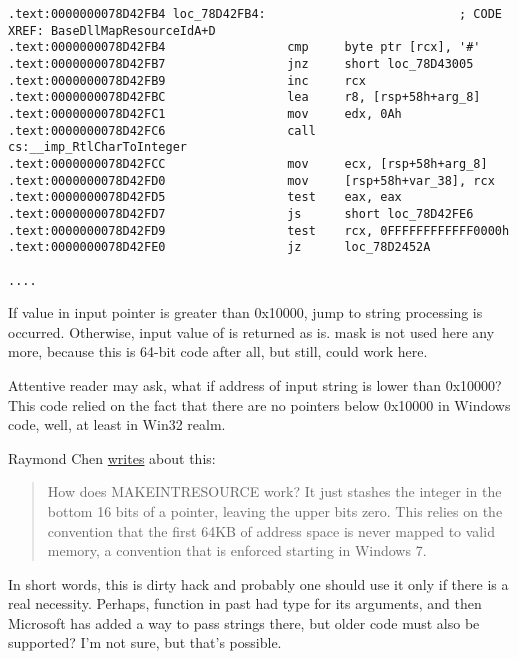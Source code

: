 \begin{lstlisting}[style=customasm]
.text:0000000078D42FB4 loc_78D42FB4:                           ; CODE XREF: BaseDllMapResourceIdA+D
.text:0000000078D42FB4                 cmp     byte ptr [rcx], '#'
.text:0000000078D42FB7                 jnz     short loc_78D43005
.text:0000000078D42FB9                 inc     rcx
.text:0000000078D42FBC                 lea     r8, [rsp+58h+arg_8]
.text:0000000078D42FC1                 mov     edx, 0Ah
.text:0000000078D42FC6                 call    cs:__imp_RtlCharToInteger
.text:0000000078D42FCC                 mov     ecx, [rsp+58h+arg_8]
.text:0000000078D42FD0                 mov     [rsp+58h+var_38], rcx
.text:0000000078D42FD5                 test    eax, eax
.text:0000000078D42FD7                 js      short loc_78D42FE6
.text:0000000078D42FD9                 test    rcx, 0FFFFFFFFFFFF0000h
.text:0000000078D42FE0                 jz      loc_78D2452A

....

\end{lstlisting}

If value in input pointer is greater than 0x10000, jump to string processing is occurred.
Otherwise, input value of  is returned as is.
 mask is not used here any more, because this is 64-bit code after all, but still,  could work here.

Attentive reader may ask, what if address of input string is lower than 0x10000?
This code relied on the fact that there are no pointers below 0x10000 in Windows code, well, at least in Win32 realm.

Raymond Chen \href{https://blogs.msdn.microsoft.com/oldnewthing/20130925-00/?p=3123}{writes} about this:

\begin{framed}
\begin{quotation}
How does MAKE­INT­RESOURCE work? It just stashes the integer in the bottom 16 bits of a pointer, leaving the upper bits zero. This relies on the convention that the first 64KB of address space is never mapped to valid memory, a convention that is enforced starting in Windows 7.
\end{quotation}
\end{framed}

In short words, this is dirty hack and probably one should use it only if there is a real necessity.
Perhaps,  function in past had  type for its arguments, and then Microsoft has added a way to pass strings there,
but older code must also be supported? I'm not sure, but that's possible.

